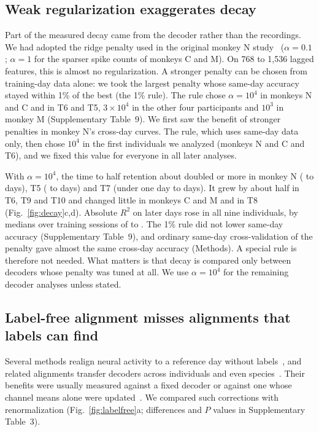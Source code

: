 \documentclass{iopjournal}
\begin{document}
\subsection{Weak regularization exaggerates decay}

Part of the measured decay came from the decoder rather than the recordings. We had adopted the ridge penalty used in
the original monkey N study~\cite{temmar2025} ($\alpha = 0.1$; $\alpha = 1$ for the sparser spike counts of monkeys C and
M). On 768 to 1,536 lagged features, this is almost no regularization. A stronger penalty can be chosen from training-day data
alone: we took the largest penalty whose same-day accuracy stayed within 1\% of the best (the 1\% rule). The rule chose
$\alpha = 10^4$ in monkeys N and C and in T6 and T5, $3 \times 10^4$ in the other four participants and $10^3$ in monkey
M (Supplementary Table~9). We first saw the benefit of stronger penalties in monkey N's cross-day curves. The rule, which
uses same-day data only, then chose $10^4$ in the first individuals we analyzed (monkeys N and C and T6), and we fixed
this value for everyone in all later analyses.

With $\alpha = 10^4$, the time to half retention about doubled or more in monkey N ( to
 days), T5 ( to  days) and T7 (under one day to 
days). It grew by about half in T6, T9 and T10 and changed little in monkeys C and M and in T8 (Fig.~\ref{fig:decay}c,d).
Absolute $R^2$ on later days rose in all nine individuals, by medians over training sessions of
 to . The 1\% rule did not lower same-day accuracy (Supplementary
Table~9), and ordinary same-day cross-validation of the penalty gave almost the same cross-day accuracy (Methods). A
special rule is therefore not needed. What matters is that decay is compared only between decoders whose penalty was
tuned at all. We use $\alpha = 10^4$ for the remaining decoder analyses unless stated.

\subsection{Label-free alignment misses alignments that labels can find}

Several methods realign neural activity to a reference day without labels~\cite{degenhart2020,gallego2020,
farshchian2019,ma2023,karpowicz2025,jude2022,wang2023erdiff}, and related alignments transfer decoders across
individuals and even species~\cite{safaie2023,rizzoglio2023}. Their benefits were usually measured against a fixed decoder or against one whose
channel means alone were updated~\cite{ma2023,wilson2025}. We compared such corrections with renormalization
(Fig.~\ref{fig:labelfree}a; differences and $P$ values in Supplementary Table~3).
\end{document}
